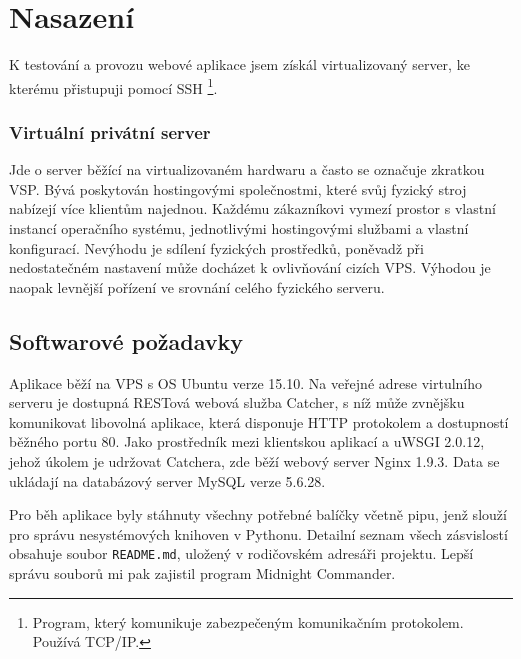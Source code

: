 \chapter{Nasazení}


\indent

K testování a provozu webové aplikace jsem získál virtualizovaný server, ke kterému přistupuji pomocí SSH
\footnote{Program, který komunikuje zabezpečeným komunikačním protokolem. Používá TCP/IP.}.

\subsection*{Virtuální privátní server}

\indent

Jde o server běžící na virtualizovaném hardwaru a často se označuje zkratkou VSP.
Bývá poskytován hostingovými společnostmi, které svůj fyzický stroj nabízejí více klientům najednou.
Každému zákazníkovi vymezí prostor s vlastní instancí operačního systému, jednotlivými hostingovými službami
a vlastní konfigurací. Nevýhodu je sdílení fyzických prostředků, poněvadž při nedostatečném nastavení
může docházet k ovlivňování cizích VPS. Výhodou je naopak levnější pořízení ve srovnání celého fyzického serveru.

\section{Softwarové požadavky}

\indent

Aplikace běží na VPS s OS Ubuntu verze 15.10. Na veřejné adrese virtulního serveru
je dostupná RESTová webová služba Catcher, s níž může zvnějšku komunikovat libovolná aplikace,
která disponuje HTTP protokolem a dostupností běžného portu 80. Jako prostředník mezi klientskou aplikací
a uWSGI 2.0.12, jehož úkolem je udržovat Catchera, zde běží webový server Nginx 1.9.3.
Data se ukládají na databázový server MySQL verze 5.6.28.

\medskip

Pro běh aplikace byly stáhnuty všechny potřebné balíčky včetně pipu,
jenž slouží pro správu nesystémových knihoven v Pythonu. Detailní seznam všech zásvislostí obsahuje soubor
\texttt{README.md}, uložený v rodičovském adresáři projektu. Lepší správu souborů mi pak zajistil program Midnight Commander.

